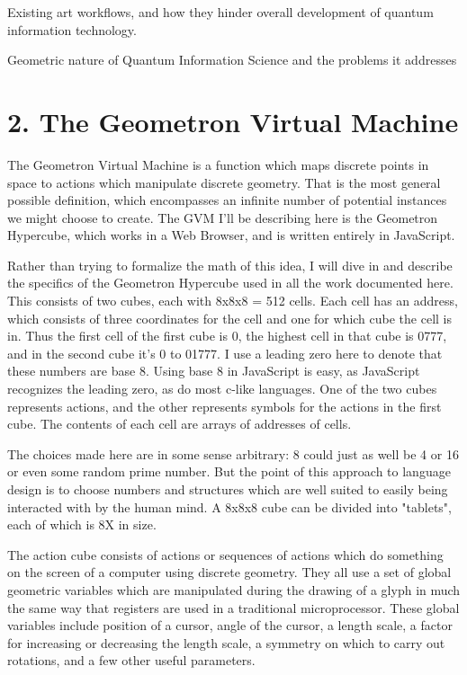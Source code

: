 \documentclass[11pt]{article}
\begin{document}
    Existing art workflows, and how they hinder overall development of quantum information technology. 



Geometric nature of Quantum Information Science and the problems it addresses


\section{
2. The Geometron Virtual Machine}



    The Geometron Virtual Machine is a function which maps discrete points in space to actions which manipulate discrete geometry.  That is the most general possible definition, which encompasses an infinite number of potential instances we might choose to create.  The GVM I'll be describing here is the Geometron Hypercube, which works in a Web Browser, and is written entirely in JavaScript.   



Rather than trying to formalize the math of this idea, I will dive in and describe the specifics of the Geometron Hypercube used in all the work documented here.  This consists of two cubes, each with 8x8x8 = 512 cells.  Each cell has an address, which consists of three coordinates for the cell and one for which cube the cell is in.  Thus the first cell of the first cube is 0, the highest cell in that cube is 0777, and in the second cube it's 0 to 01777.  I use a leading zero here to denote that these numbers are base 8.  Using base 8 in JavaScript is easy, as JavaScript recognizes the leading zero, as do most c-like languages.   One of the two cubes represents actions, and the other represents symbols for the actions in the first cube.  The contents of each cell are arrays of addresses of cells.  




    The choices made here are in some sense arbitrary: 8 could just as well be 4 or 16 or even some random prime number.  But the point of this approach to language design is to choose numbers and structures which are well suited to easily being interacted with by the human mind.  A 8x8x8 cube can be divided into "tablets", each of which is 8X in size.  




    The action cube consists of actions or sequences of actions which do something on the screen of a computer using discrete geometry.  They all use a set of global geometric variables which are manipulated during the drawing of a glyph in much the same way that registers are used in a traditional microprocessor.  These global variables include position of a cursor, angle of the cursor, a length scale, a factor for increasing or decreasing the length scale, a symmetry on which to carry out rotations, and a few other useful parameters.   
\end{document}
